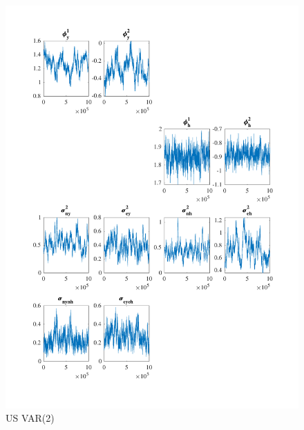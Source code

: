 \documentclass[
  12pt,
]{article}
\begin{document}
\begin{figure}

{\centering \includegraphics[width=0.85\linewidth]{../../Regression/Bayesian_UC_VAR2_nodrift/OutputData/posteriorchain_US} 

}

\caption{US VAR(2)}\label{fig:unnamed-chunk-18}
\end{figure}
\end{document}
